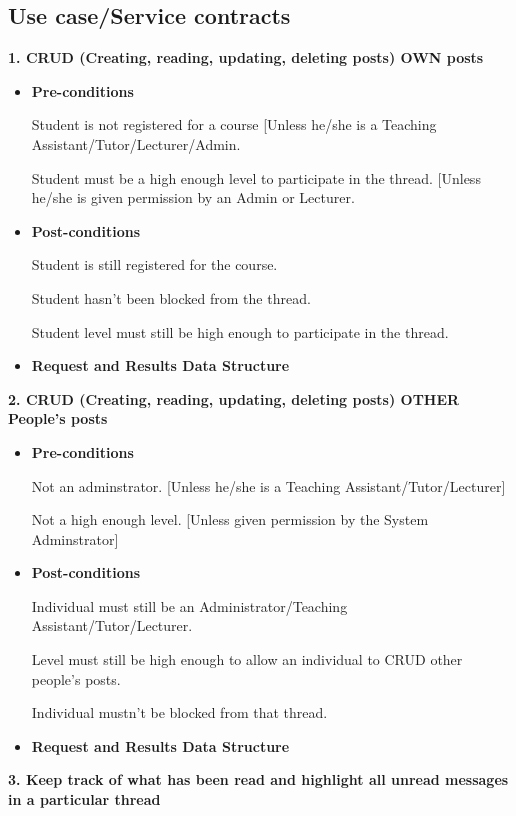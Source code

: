 \documentclass[a4paper,12pt]{report}
\begin{document}
\subsection{Use case/Service contracts}

\textbf {1. CRUD (Creating, reading, updating, deleting posts) OWN posts}
\begin{itemize}
    \item\textbf{Pre-conditions}

	{ Student is not registered for a course [Unless he/she is a Teaching Assistant/Tutor/Lecturer/Admin.}

	{Student must be a high enough level to participate in the thread. [Unless he/she is given permission by an Admin or Lecturer.}
 
    \item\textbf{Post-conditions }

	{Student is still registered for the course.}

	{Student hasn't been blocked from the thread.}

	{Student level must still be high enough to participate in the thread.} 

    \item\textbf{Request and Results Data Structure} 

\end{itemize}
\textbf {2. CRUD (Creating, reading, updating, deleting posts) OTHER People's posts}
\begin{itemize}
    \item\textbf{Pre-conditions}

	{Not an adminstrator. [Unless he/she is a Teaching Assistant/Tutor/Lecturer]}

	{Not a high enough level. [Unless given permission by the System Adminstrator]}
 
    \item\textbf{Post-conditions }

	{Individual must still be an Administrator/Teaching Assistant/Tutor/Lecturer.}

	{Level must still be high enough to allow an individual to CRUD other people's posts.}

	{Individual mustn't be blocked from that thread.}


    \item\textbf{Request and Results Data Structure} 

\end{itemize}
\textbf {3. Keep track of what has been read and highlight all unread messages in a particular thread}
\end{document}
